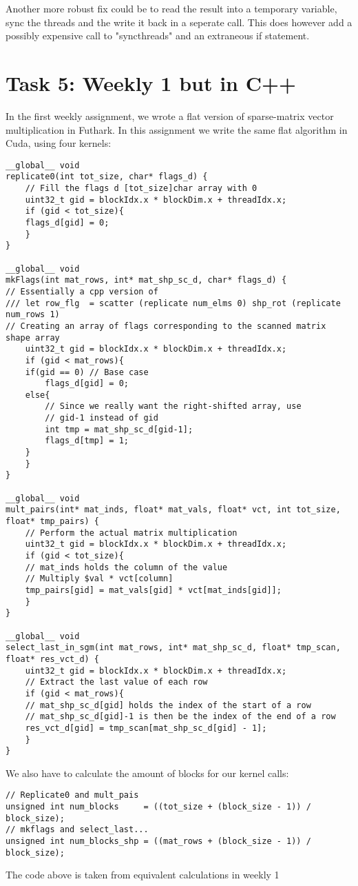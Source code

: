 \documentclass[11pt]{article}
\begin{document}
Another more robust fix could be to read the result into a temporary variable,
sync the threads and the write it back in a seperate call. This does
however add a possibly expensive call to "syncthreads" and an extraneous
if statement.

\section{Task 5: Weekly 1 but in C++}
\label{sec:org2a3ade4}
In the first weekly assignment, we wrote a flat version of sparse-matrix
vector multiplication in Futhark. In this assignment we write the same
flat algorithm in Cuda, using four kernels: 
\begin{verbatim}
__global__ void
replicate0(int tot_size, char* flags_d) {
    // Fill the flags d [tot_size]char array with 0
    uint32_t gid = blockIdx.x * blockDim.x + threadIdx.x;
    if (gid < tot_size){
	flags_d[gid] = 0;
    }
}

__global__ void
mkFlags(int mat_rows, int* mat_shp_sc_d, char* flags_d) {
// Essentially a cpp version of
/// let row_flg  = scatter (replicate num_elms 0) shp_rot (replicate num_rows 1)
// Creating an array of flags corresponding to the scanned matrix shape array
    uint32_t gid = blockIdx.x * blockDim.x + threadIdx.x;
    if (gid < mat_rows){
	if(gid == 0) // Base case
	    flags_d[gid] = 0;
	else{
	    // Since we really want the right-shifted array, use 
	    // gid-1 instead of gid
	    int tmp = mat_shp_sc_d[gid-1];
	    flags_d[tmp] = 1;
	}
    }
}

__global__ void 
mult_pairs(int* mat_inds, float* mat_vals, float* vct, int tot_size, float* tmp_pairs) {
    // Perform the actual matrix multiplication
    uint32_t gid = blockIdx.x * blockDim.x + threadIdx.x;
    if (gid < tot_size){
	// mat_inds holds the column of the value
	// Multiply $val * vct[column]
	tmp_pairs[gid] = mat_vals[gid] * vct[mat_inds[gid]];
    }
}

__global__ void
select_last_in_sgm(int mat_rows, int* mat_shp_sc_d, float* tmp_scan, float* res_vct_d) {
    uint32_t gid = blockIdx.x * blockDim.x + threadIdx.x;
    // Extract the last value of each row
    if (gid < mat_rows){
	// mat_shp_sc_d[gid] holds the index of the start of a row
	// mat_shp_sc_d[gid]-1 is then be the index of the end of a row
	res_vct_d[gid] = tmp_scan[mat_shp_sc_d[gid] - 1];
    }
}
\end{verbatim}

We also have to calculate the amount of blocks for our kernel calls:
\begin{verbatim}
// Replicate0 and mult_pais
unsigned int num_blocks     = ((tot_size + (block_size - 1)) / block_size);
// mkflags and select_last...
unsigned int num_blocks_shp = ((mat_rows + (block_size - 1)) / block_size);  
\end{verbatim}
The code above is taken from equivalent calculations in weekly 1
\end{document}
